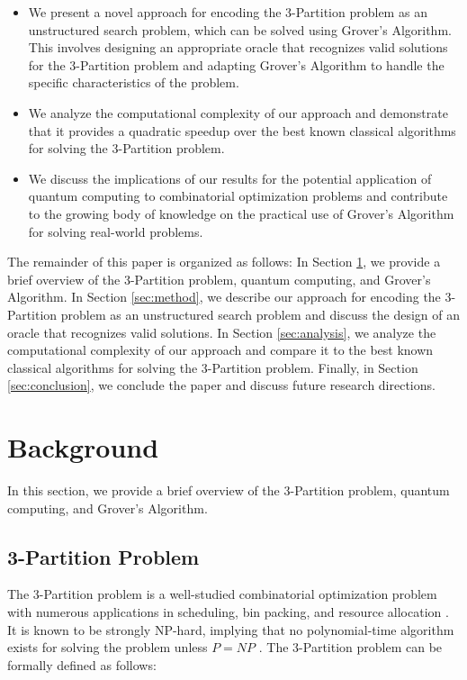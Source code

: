 \begin{itemize}
    \item We present a novel approach for encoding the 3-Partition problem as an unstructured search problem, which can be solved using Grover's Algorithm. This involves designing an appropriate oracle that recognizes valid solutions for the 3-Partition problem and adapting Grover's Algorithm to handle the specific characteristics of the problem.
    \item We analyze the computational complexity of our approach and demonstrate that it provides a quadratic speedup over the best known classical algorithms for solving the 3-Partition problem.
    \item We discuss the implications of our results for the potential application of quantum computing to combinatorial optimization problems and contribute to the growing body of knowledge on the practical use of Grover's Algorithm for solving real-world problems.
\end{itemize}

The remainder of this paper is organized as follows: In Section \ref{sec:background}, we provide a brief overview of the 3-Partition problem, quantum computing, and Grover's Algorithm. In Section \ref{sec:method}, we describe our approach for encoding the 3-Partition problem as an unstructured search problem and discuss the design of an oracle that recognizes valid solutions. In Section \ref{sec:analysis}, we analyze the computational complexity of our approach and compare it to the best known classical algorithms for solving the 3-Partition problem. Finally, in Section \ref{sec:conclusion}, we conclude the paper and discuss future research directions.

\section{Background}
\label{sec:background}

In this section, we provide a brief overview of the 3-Partition problem, quantum computing, and Grover's Algorithm.

\subsection{3-Partition Problem}

The 3-Partition problem is a well-studied combinatorial optimization problem with numerous applications in scheduling, bin packing, and resource allocation \cite{korf1998partition}. It is known to be strongly NP-hard, implying that no polynomial-time algorithm exists for solving the problem unless $P = NP$ \cite{garey1979computers}. The 3-Partition problem can be formally defined as follows:

